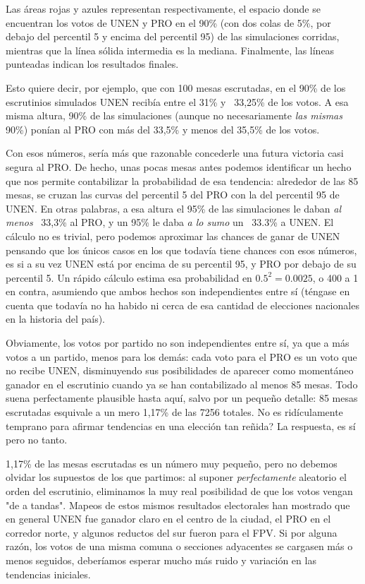 \documentclass[12pt, a4paper]{article}
\begin{document}
Las \'areas rojas y azules representan respectivamente, el espacio donde se encuentran los votos de UNEN y PRO en el 90\% (con dos colas de 5\%, por debajo del percentil 5 y encima del percentil 95) de las simulaciones corridas, mientras que la l\'inea s\'olida intermedia es la mediana. Finalmente, las l\'ineas punteadas indican los resultados finales.

Esto quiere decir, por ejemplo, que con 100 mesas escrutadas, en el 90\% de los escrutinios simulados UNEN recib\'ia entre el 31\% y ~33,25\% de los votos. A esa misma altura, 90\% de las simulaciones (aunque no necesariamente \emph{las mismas} 90\%) pon\'ian al PRO con m\'as del 33,5\% y menos del 35,5\% de los votos.

Con esos n\'umeros, ser\'ia m\'as que razonable concederle una futura victoria casi segura al PRO. De hecho, unas pocas mesas antes podemos identificar un hecho que nos permite contabilizar la probabilidad de esa tendencia: alrededor de las 85 mesas, se cruzan las curvas del percentil 5 del PRO con la del percentil 95 de UNEN. En otras palabras, a esa altura el 95\% de las simulaciones le daban \emph{al menos} ~33,3\% al PRO, y un 95\% le daba \emph{a lo sumo} un ~33.3\% a UNEN.
El c\'alculo no es trivial, pero podemos aproximar las chances de ganar de UNEN pensando que los \'unicos casos en los que todav\'ia tiene chances con esos n\'umeros, es si a su vez UNEN est\'a por encima de su percentil 95, y PRO por debajo de su percentil 5. Un r\'apido c\'alculo estima esa probabilidad en $0.5^{2} = 0.0025$, o 400 a 1 en contra, asumiendo que ambos hechos son independientes entre s\'i (t\'engase en cuenta que todav\'ia no ha habido ni cerca de esa cantidad de elecciones nacionales en la historia del pa\'is).

Obviamente, los votos por partido no son independientes entre s\'i, ya que a m\'as votos a un partido, menos para los dem\'as: cada voto para el PRO es un voto que no recibe UNEN, disminuyendo sus posibilidades de aparecer como moment\'aneo ganador en el escrutinio cuando ya se han contabilizado al menos 85 mesas. Todo suena perfectamente plausible hasta aqu\'i, salvo por un peque\~no detalle: 85 mesas escrutadas esquivale a un mero 1,17\% de las 7256 totales. No es rid\'iculamente temprano para afirmar tendencias en una elecci\'on tan re\~nida? La respuesta, es s\'i pero no tanto.

1,17\% de las mesas escrutadas es un n\'umero muy peque\~no, pero no debemos olvidar los supuestos de los que partimos: al suponer \emph{perfectamente} aleatorio el orden del escrutinio, eliminamos la muy real posibilidad de que los votos vengan "de a tandas". Mapeos de estos mismos resultados electorales han mostrado que en general UNEN fue ganador claro en el centro de la ciudad, el PRO en el corredor norte, y algunos reductos del sur fueron para el FPV. Si por alguna raz\'on, los votos de una misma comuna o secciones adyacentes se cargasen m\'as o menos seguidos, deber\'iamos esperar mucho m\'as ruido y variaci\'on en las tendencias iniciales.
\end{document}

